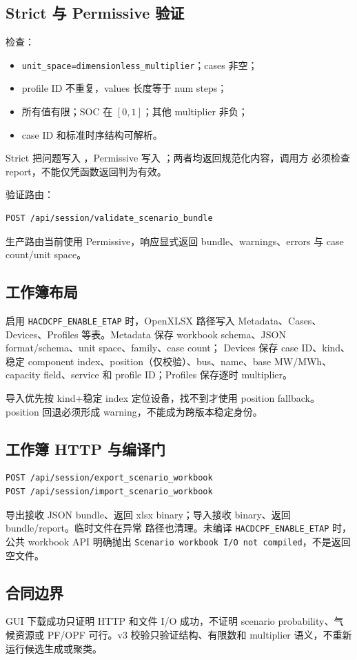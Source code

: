 \subsection{Strict 与 Permissive 验证}
 检查：
\begin{itemize}
  \item \texttt{unit\_space=dimensionless\_multiplier}；cases 非空；
  \item profile ID 不重复，values 长度等于 num steps；
  \item 所有值有限；SOC 在 $[0,1]$；其他 multiplier 非负；
  \item case ID 和标准时序结构可解析。
\end{itemize}
Strict 把问题写入 ，Permissive 写入 ；两者均返回规范化内容，调用方
必须检查 report，不能仅凭函数返回判为有效。

验证路由：
\begin{verbatim}
POST /api/session/validate_scenario_bundle
\end{verbatim}
生产路由当前使用 Permissive，响应显式返回 bundle、warnings、errors 与 case count/unit space。

\subsection{工作簿布局}
启用 \texttt{HACDCPF\_ENABLE\_ETAP} 时，OpenXLSX 路径写入 Metadata、Cases、Devices、Profiles
等表。Metadata 保存 workbook schema、JSON format/schema、unit space、family、case count；
Devices 保存 case ID、kind、稳定 component index、position（仅校验）、bus、name、base MW/MWh、
capacity field、service 和 profile ID；Profiles 保存逐时 multiplier。

导入优先按 kind+稳定 index 定位设备，找不到才使用 position fallback。position 回退必须形成
warning，不能成为跨版本稳定身份。

\subsection{工作簿 HTTP 与编译门}
\begin{verbatim}
POST /api/session/export_scenario_workbook
POST /api/session/import_scenario_workbook
\end{verbatim}
导出接收 JSON bundle、返回 xlsx binary；导入接收 binary、返回 bundle/report。临时文件在异常
路径也清理。未编译 \texttt{HACDCPF\_ENABLE\_ETAP} 时，公共 workbook API 明确抛出
\texttt{Scenario workbook I/O not compiled}，不是返回空文件。

\subsection{合同边界}
GUI 下载成功只证明 HTTP 和文件 I/O 成功，不证明 scenario probability、气候资源或 PF/OPF
可行。v3 校验只验证结构、有限数和 multiplier 语义，不重新运行候选生成或聚类。
